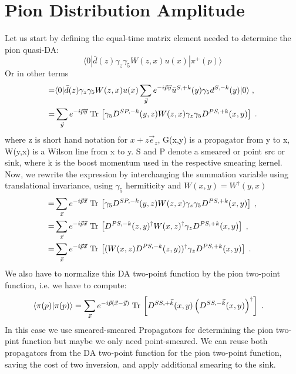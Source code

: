 \documentclass[a4paper,10pt]{scrartcl}
\newcommand{\tr}{\text{Tr\,}}
\begin{document}
\section{Pion Distribution Amplitude}
Let us start by defining the equal-time matrix element needed to determine the pion quasi-DA:
\begin{equation}
    \langle 0 | \bar d(z) \gamma_z \gamma_5 W(z,x) u(x) | \pi^+ (p) \rangle 
\end{equation}
Or in other terms
\begin{align}
     =& \langle 0 | \bar d(z) \gamma_z \gamma_5 W(z,x) u(x) \sum_{\vec y} e^{-i \vec p \vec y} \bar u^{S,+k}(y) \gamma_5 d^{S,-k}(y)| 0 \rangle \; , \\
     =& \sum_{\vec y} e^{-i \vec p \vec y} \; \tr \left[ \gamma_5 D^{SP,-k}(y,z) W(z,x) \gamma_z \gamma_5 D^{PS,+k}(x,y) \right] \; .
\end{align}
where z is short hand notation for $x+ z \vec e_z$, G(x,y) is a propagator from y to x, W(y,x) is a Wilson line from x to y. S and P denote a smeared or point src or sink, where k is the boost momentum 
used in the respective smearing kernel. Now, we rewrite the expression by interchanging the summation variable using translational invariance, using $\gamma_5$ hermiticity and
$W(x,y) = W^\dagger(y,x)$
\begin{align}
    =& \sum_{\vec x} e^{-i \vec p \vec x} \; \tr \left[ \gamma_5 D^{SP,-k}(y,z) W(z,x) \gamma_z \gamma_5 D^{PS,+k}(x,y) \right] \; , \\
    =& \sum_{\vec x} e^{-i \vec p \vec x} \; \tr \left[ D^{PS,-k}(z,y)^\dagger W(x,z)^\dagger \gamma_z D^{PS,+k}(x,y) \right] \; , \\
    =& \sum_{\vec x} e^{-i \vec p \vec x} \; \tr \left[ (W(x,z) D^{PS,-k}(z,y))^\dagger \gamma_z D^{PS,+k}(x,y) \right] \; .
\end{align}
We also have to normalize this DA two-point function by the pion two-point function, i.e. we have to compute:
\begin{align}
    \langle \pi (p) | \pi(p) \rangle & = \sum_{\vec x} e^{-i \vec p (\vec x - \vec y)} \; \tr \left[ D^{SS , +\vec k}(x,y) \left( D^{SS, -\vec k}(x,y)\right)^\dagger \right] \; .
\end{align}
In this case we use smeared-smeared Propagators for determining the pion two-pint function but maybe we only need point-smeared. 
We can reuse both propagators from the DA two-point function for the pion two-point function, saving the cost of two inversion, and apply additional smearing
to the sink.
\end{document}
